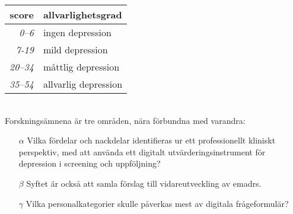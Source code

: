\documentclass[12pt,a4paper,oneside]{article}
\begin{document}
\begin{tabular}{r|l}
{\bf score} & {\bf allvarlighetsgrad} \\
\hline {\it 0--6} & ingen depression \\
{\it 7-19} & mild depression \\
{\it 20--34} & m{\aa}ttlig depression \\
{\it 35--54} & allvarlig depression \\\end{tabular}\vspace{1em}
\\Forsknings{\"a}mnena {\"a}r tre omr{\aa}den, n{\"a}ra f{\"o}rbundna med varandra:
\begin{itemize}
\item[$\alpha$] Vilka f{\"o}rdelar och nackdelar identifieras ur ett professionellt kliniskt perspektiv, med att anv{\"a}nda ett digitalt utv{\"a}rderingsinstrument f{\"o}r depression i screening och uppf{\"o}ljning?
\item[$\beta$] Syftet {\"a}r ocks{\aa} att samla f{\"o}rslag till vidareutveckling av e{\sc madrs}.
\item[$\gamma$] Vilka personalkategorier skulle p{\aa}verkas mest av digitala fr{\aa}geformul{\"a}r?
\end{itemize}
\end{document}
